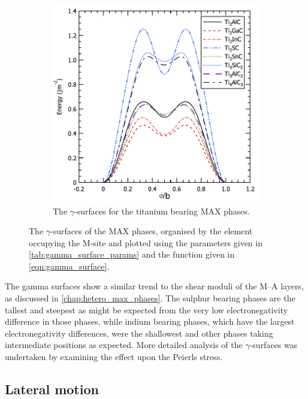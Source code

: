 \begin{figure}[!htb]
\begin{subfigure}{5cm}
\centering
\includegraphics[width=\textwidth]{Ti_gamma_surfaces}
\caption{The $\gamma$-surfaces for the titanium bearing MAX phases.\label{fig:Ti_gamma_surfaces}}
\end{subfigure}

\captionsetup{width=12cm}
\caption[The \texorpdfstring{$\gamma$}{gamma}-surfaces of the MAX phases.]{The $\gamma$-surfaces of the MAX phases, organised by the element occupying the M-site and plotted using the parameters given in \autoref{tab:gamma_surface_params} and the function given in \autoref{eqn:gamma_surface}. \label{fig:gamma_surfaces}}
\end{figure}


The gamma surfaces show a similar trend to the shear moduli of the M--A layers, as discussed in \autoref{chap:hetero_max_phases}. The sulphur bearing phases are the tallest and steepest as might be expected from the very low electronegativity difference in those phases, while indium bearing phases, which have the largest electronegativity differences, were the shallowest and other phases taking intermediate positions as expected. More detailed analysis of the $\gamma$-surfaces was undertaken by examining the effect upon the Peierls stress.


\subsection{Lateral motion}



